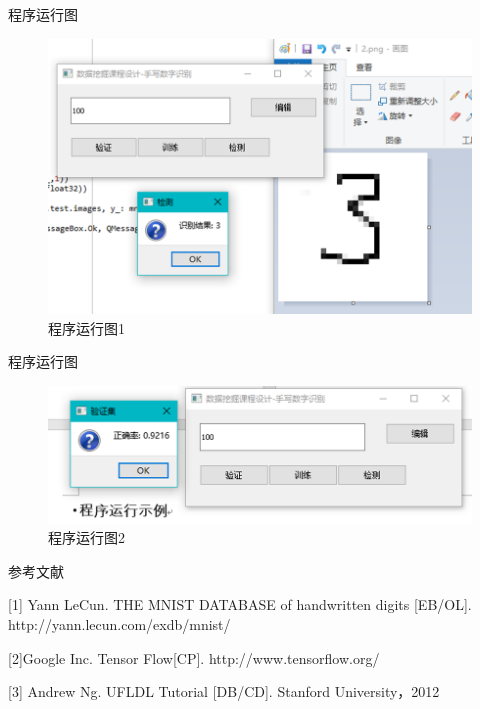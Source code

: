 \documentclass[newPxFont,sthlmFooter]{beamer}
\begin{document}
\begin{frame}{程序运行图}

\begin{figure}
	\centering
	\includegraphics[width=0.7\linewidth]{screenshot002}
	\caption{程序运行图1}
	\label{fig:screenshot002}
\end{figure}

\end{frame}

\begin{frame}{程序运行图}

\begin{figure}
	\centering
	\includegraphics[width=0.7\linewidth]{screenshot003}
	\caption{程序运行图2}
	\label{fig:screenshot003}
\end{figure}

\end{frame}

\begin{frame}{参考文献}

[1] Yann LeCun. THE MNIST DATABASE
of handwritten digits [EB/OL]. http://yann.lecun.com/exdb/mnist/

[2]Google Inc. Tensor Flow[CP]. http://www.tensorflow.org/

[3] Andrew Ng. UFLDL Tutorial [DB/CD]. Stanford University，2012


\end{frame}
\end{document}
